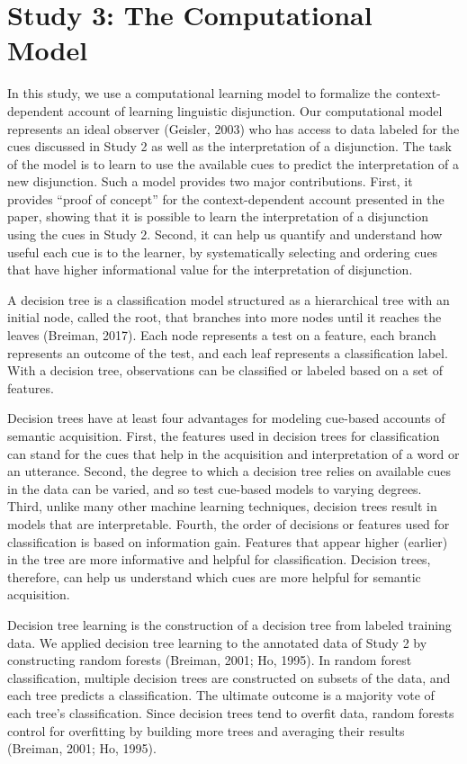 \documentclass[
  english,
  ,man,floatsintext]{apa6}
\begin{document}
\hypertarget{study-3-the-computational-model}{%
\section{Study 3: The Computational Model}\label{study-3-the-computational-model}}

In this study, we use a computational learning model to formalize the context-dependent account of learning linguistic disjunction. Our computational model represents an ideal observer (Geisler, 2003) who has access to data labeled for the cues discussed in Study 2 as well as the interpretation of a disjunction. The task of the model is to learn to use the available cues to predict the interpretation of a new disjunction. Such a model provides two major contributions. First, it provides ``proof of concept'' for the context-dependent account presented in the paper, showing that it is possible to learn the interpretation of a disjunction using the cues in Study 2. Second, it can help us quantify and understand how useful each cue is to the learner, by systematically selecting and ordering cues that have higher informational value for the interpretation of disjunction.

A decision tree is a classification model structured as a hierarchical tree with an initial node, called the root, that branches into more nodes until it reaches the leaves (Breiman, 2017). Each node represents a test on a feature, each branch represents an outcome of the test, and each leaf represents a classification label. With a decision tree, observations can be classified or labeled based on a set of features.

Decision trees have at least four advantages for modeling cue-based accounts of semantic acquisition. First, the features used in decision trees for classification can stand for the cues that help in the acquisition and interpretation of a word or an utterance. Second, the degree to which a decision tree relies on available cues in the data can be varied, and so test cue-based models to varying degrees. Third, unlike many other machine learning techniques, decision trees result in models that are interpretable. Fourth, the order of decisions or features used for classification is based on information gain. Features that appear higher (earlier) in the tree are more informative and helpful for classification. Decision trees, therefore, can help us understand which cues are more helpful for semantic acquisition.

Decision tree learning is the construction of a decision tree from labeled training data. We applied decision tree learning to the annotated data of Study 2 by constructing random forests (Breiman, 2001; Ho, 1995). In random forest classification, multiple decision trees are constructed on subsets of the data, and each tree predicts a classification. The ultimate outcome is a majority vote of each tree's classification. Since decision trees tend to overfit data, random forests control for overfitting by building more trees and averaging their results (Breiman, 2001; Ho, 1995).
\end{document}

